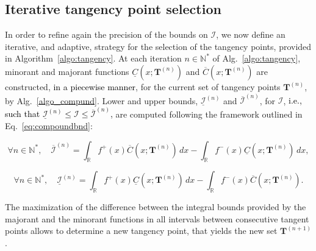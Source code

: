 \documentclass[review]{elsarticle}
\newcommand{\cblue}{\textcolor{black}}
\newcommand{\Ic}{\mathcal{I}}
\newcommand{\bN}{\mathbb{N}}
\begin{document}
\subsection{Iterative tangency point selection}
In order to refine again the precision of the bounds on $\Ic$, we now define an iterative, and adaptive, strategy for the selection of the tangency points, provided in Algorithm~\ref{algo:tangency}. At each iteration $n \in \bN^*$ of Alg.~\ref{algo:tangency}, minorant and majorant functions $\underline{C}(x;\mathbf{T}^{(n)})$ and $\overline{C}(x;\mathbf{T}^{(n)})$ are constructed, \cblue{in a piecewise manner}, for the current set of tangency points $\mathbf{T}^{(n)}$, by Alg.~\ref{algo_compund}. Lower and upper bounds, \( \underline{\Ic}^{(n)} \) and \( \overline{\Ic}^{(n)} \), for \( \Ic \), \cblue{i.e., such that $\underline{\Ic}^{(n)} \leq \Ic \leq \overline{\Ic}^{(n)}$,} are computed following the framework outlined in Eq.~\eqref{eq:compoundbnd}:

\begin{equation}
    \forall n \in \mathbb{N}^*, \quad \overline{\Ic}^{(n)} = \int_{\mathbb{R}} f^+(x) \overline{C}(x; \mathbf{T}^{(n)}) \, dx-\int_{\mathbb{R}} f^-(x) \underline{C}(x; \mathbf{T}^{(n)}) \, dx,
    \label{eq:ub_I}
\end{equation}

\begin{equation}
    \forall n \in \mathbb{N}^*, \quad \underline{\Ic}^{(n)} = \int_{\mathbb{R}} f^+(x) \underline{C}(x; \mathbf{T}^{(n)}) \, dx -\int_{\mathbb{R}} f^-(x) \overline{C}(x; \mathbf{T}^{(n)}).
    \label{eq:lb_I}
\end{equation}

The maximization of the difference between the {integral bounds provided by} the majorant and the minorant functions in all intervals between consecutive tangent points allows to determine a new tangency point, that yields the new set $\mathbf{T}^{(n+1)}$. 
\end{document}
